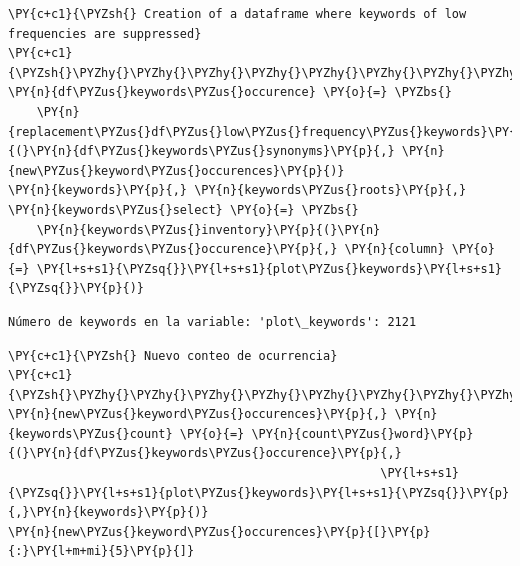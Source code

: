     \begin{tcolorbox}[breakable, size=fbox, boxrule=1pt, pad at break*=1mm,colback=cellbackground, colframe=cellborder]
\begin{Verbatim}[commandchars=\\\{\}]
\PY{c+c1}{\PYZsh{} Creation of a dataframe where keywords of low frequencies are suppressed}
\PY{c+c1}{\PYZsh{}\PYZhy{}\PYZhy{}\PYZhy{}\PYZhy{}\PYZhy{}\PYZhy{}\PYZhy{}\PYZhy{}\PYZhy{}\PYZhy{}\PYZhy{}\PYZhy{}\PYZhy{}\PYZhy{}\PYZhy{}\PYZhy{}\PYZhy{}\PYZhy{}\PYZhy{}\PYZhy{}\PYZhy{}\PYZhy{}\PYZhy{}\PYZhy{}\PYZhy{}\PYZhy{}\PYZhy{}\PYZhy{}\PYZhy{}\PYZhy{}\PYZhy{}\PYZhy{}\PYZhy{}\PYZhy{}\PYZhy{}\PYZhy{}\PYZhy{}\PYZhy{}\PYZhy{}\PYZhy{}\PYZhy{}\PYZhy{}\PYZhy{}\PYZhy{}\PYZhy{}\PYZhy{}\PYZhy{}\PYZhy{}\PYZhy{}\PYZhy{}\PYZhy{}\PYZhy{}\PYZhy{}\PYZhy{}\PYZhy{}\PYZhy{}\PYZhy{}\PYZhy{}\PYZhy{}\PYZhy{}\PYZhy{}\PYZhy{}\PYZhy{}\PYZhy{}\PYZhy{}\PYZhy{}\PYZhy{}\PYZhy{}\PYZhy{}\PYZhy{}\PYZhy{}\PYZhy{}\PYZhy{}}
\PY{n}{df\PYZus{}keywords\PYZus{}occurence} \PY{o}{=} \PYZbs{}
    \PY{n}{replacement\PYZus{}df\PYZus{}low\PYZus{}frequency\PYZus{}keywords}\PY{p}{(}\PY{n}{df\PYZus{}keywords\PYZus{}synonyms}\PY{p}{,} \PY{n}{new\PYZus{}keyword\PYZus{}occurences}\PY{p}{)}
\PY{n}{keywords}\PY{p}{,} \PY{n}{keywords\PYZus{}roots}\PY{p}{,} \PY{n}{keywords\PYZus{}select} \PY{o}{=} \PYZbs{}
    \PY{n}{keywords\PYZus{}inventory}\PY{p}{(}\PY{n}{df\PYZus{}keywords\PYZus{}occurence}\PY{p}{,} \PY{n}{column} \PY{o}{=} \PY{l+s+s1}{\PYZsq{}}\PY{l+s+s1}{plot\PYZus{}keywords}\PY{l+s+s1}{\PYZsq{}}\PY{p}{)}    
\end{Verbatim}
\end{tcolorbox}

    \begin{Verbatim}[commandchars=\\\{\}]
Número de keywords en la variable: 'plot\_keywords': 2121
\end{Verbatim}

    \begin{tcolorbox}[breakable, size=fbox, boxrule=1pt, pad at break*=1mm,colback=cellbackground, colframe=cellborder]
\begin{Verbatim}[commandchars=\\\{\}]
\PY{c+c1}{\PYZsh{} Nuevo conteo de ocurrencia}
\PY{c+c1}{\PYZsh{}\PYZhy{}\PYZhy{}\PYZhy{}\PYZhy{}\PYZhy{}\PYZhy{}\PYZhy{}\PYZhy{}\PYZhy{}\PYZhy{}\PYZhy{}\PYZhy{}\PYZhy{}\PYZhy{}\PYZhy{}\PYZhy{}\PYZhy{}\PYZhy{}\PYZhy{}}
\PY{n}{new\PYZus{}keyword\PYZus{}occurences}\PY{p}{,} \PY{n}{keywords\PYZus{}count} \PY{o}{=} \PY{n}{count\PYZus{}word}\PY{p}{(}\PY{n}{df\PYZus{}keywords\PYZus{}occurence}\PY{p}{,}
                                                    \PY{l+s+s1}{\PYZsq{}}\PY{l+s+s1}{plot\PYZus{}keywords}\PY{l+s+s1}{\PYZsq{}}\PY{p}{,}\PY{n}{keywords}\PY{p}{)}
\PY{n}{new\PYZus{}keyword\PYZus{}occurences}\PY{p}{[}\PY{p}{:}\PY{l+m+mi}{5}\PY{p}{]}
\end{Verbatim}
\end{tcolorbox}

